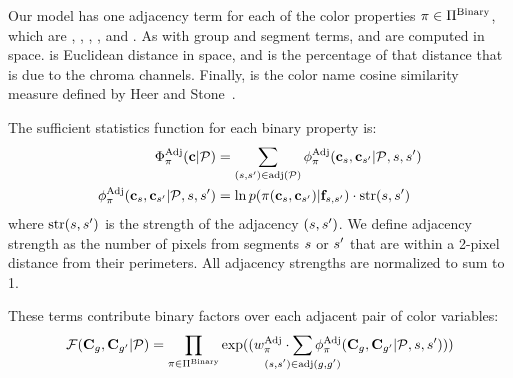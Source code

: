 
Our model has one adjacency term for each of the color properties $ \pi \in \Pi^{\textrm{Binary}}$, which are , , , , and .
As with group and segment terms,  and  are computed in \lab space.  is Euclidean distance in \lab space, and  is the percentage of that distance that is due to the chroma channels. Finally,  is the color name cosine similarity measure defined by Heer and Stone~.

The sufficient statistics function for each binary property is:
 \begin{align*}
 \Phi^{\textrm{Adj}}_\pi(\mathbf{c} | \mathcal{P}) &= \sum_{(s, {s^{\prime}}) \in \text{adj}(\mathcal{P})} \phi^{\textrm{Adj}}_\pi(\mathbf{c}_s, \mathbf{c}_{s^{\prime}} | \mathcal{P}, s, {s^{\prime}}) \\
 \phi^{\textrm{Adj}}_\pi(\mathbf{c}_s, \mathbf{c}_{s^{\prime}} | \mathcal{P}, s, {s^{\prime}}) &= \ln p( \pi( \mathbf{c}_s, \mathbf{c}_{s^{\prime}} ) | \mathbf{f}_{s, {s^{\prime}}} ) \cdot \text{str}(s, {s^{\prime}})
\end{align*}
where $\text{str}(s,{s^{\prime}})$ is the strength of the adjacency $(s,{s^{\prime}})$. We define adjacency strength as the number of pixels from segments $s$ or ${s^{\prime}}$ that are within a 2-pixel distance from their perimeters. All adjacency strengths are normalized to sum to 1.  

These terms contribute binary factors over each adjacent pair of color variables:
\begin{equation*}
 \factor(\colorVars_\group, \colorVars_\groupprime | \pattern) = \prod_{\prop \in \binaryProps} \exp( (\adjTermWeight \cdot \sum_{\mathclap{(\segment, \segprime) \in \adj(\group, \groupprime)}} \adjInstStats( \colorVars_\group, \colorVars_\groupprime | \pattern, \segment, \segprime))) 
\end{equation*}

